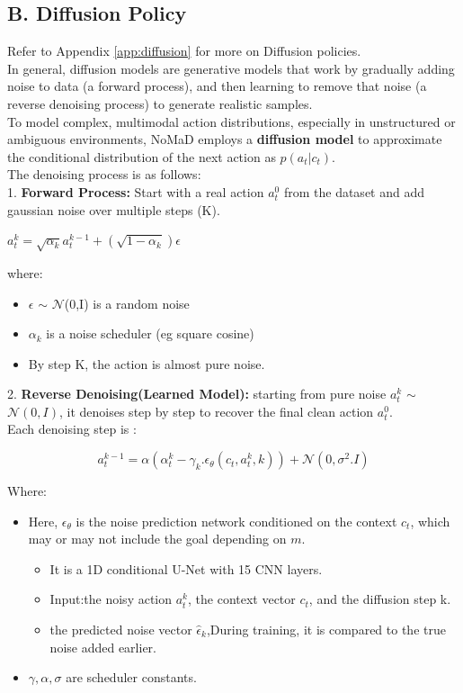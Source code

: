 \documentclass[12pt]{article}
\begin{document}
\begin{appendices}
\subsection*{B. Diffusion Policy}
Refer to Appendix \ref{app:diffusion} for more on Diffusion policies.\\
In general, diffusion models are generative models that work by gradually adding noise to data (a forward process), and then learning to remove that noise (a reverse denoising process) to generate realistic samples.\\
To model complex, multimodal action distributions, especially in unstructured or ambiguous environments, NoMaD employs a \textbf{diffusion model} to approximate the conditional distribution of the next action as $p(a_t | c_t)$. \\
The denoising process is as follows:\\
1. \textbf{Forward Process:} Start with a real action $a^{0}_t$ from the dataset and add gaussian noise over multiple steps (K). 
\begin{center}
    $a^{k}_t = \sqrt{\alpha_k} a^{k-1}_t + (\sqrt{1 - \alpha_k}) \epsilon$
\end{center}
where:\\
\begin{itemize}
    \item $\epsilon$ $\sim$ $\mathcal{N}$(0,I) is a random noise
    \item $\alpha_k$ is a noise scheduler (eg square cosine)
    \item By step K, the action is almost pure noise.
\end{itemize}
2. \textbf{Reverse Denoising(Learned Model):} starting from pure noise $a^{k}_t$ $\sim$ $\mathcal{N}(0,I)$, it denoises step by step to recover the final clean action $a^{0}_t$.\\
Each denoising step is :
\begin{center}
    \[a^{k-1}_t = \alpha(\alpha^{k}_t-\gamma_k.\epsilon_{\theta}(c_t, a^{k}_t,k)) + \mathcal{N}(0,\sigma^2.I)\]
\end{center}
Where:
\begin{itemize}
    \item Here, $\epsilon_\theta$ is the noise prediction network conditioned on the context $c_t$, which may or may not include the goal depending on $m$.
    \begin{itemize}
        \item It is a 1D conditional U-Net with 15 CNN layers.
        \item Input:the noisy action $a^{k}_t$, the context vector $c_t$, and the diffusion step k.
        \item the predicted noise vector $\hat{\epsilon}_k$,During training, it is compared to the true noise added earlier.
    \end{itemize}
    \item $\gamma, \alpha ,\sigma$ are scheduler constants.
\end{itemize}


\end{appendices}
\end{document}
